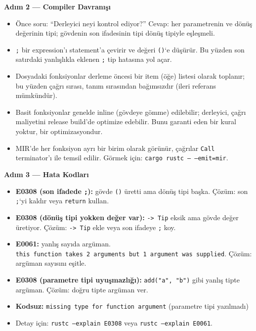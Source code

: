 \documentclass[12pt,a4paper]{article}
\begin{document}
\textbf{Adım 2 --- Compiler Davranışı}

\begin{itemize}
\tightlist
\item
  Önce soru: ``Derleyici neyi kontrol ediyor?'' Cevap: her parametrenin ve dönüş değerinin tipi; gövdenin son ifadesinin tipi dönüş tipiyle eşleşmeli.
\item
  \texttt{;} bir expression'ı statement'a çevirir ve değeri \texttt{()}`e düşürür. Bu yüzden son satırdaki yanlışlıkla eklenen \texttt{;} tip hatasına yol açar.
\item
  Dosyadaki fonksiyonlar derleme öncesi bir item (öğe) listesi olarak toplanır; bu yüzden çağrı sırası, tanım sırasından bağımsızdır (ileri referans mümkündür).
\item
  Basit fonksiyonlar genelde inline (gövdeye gömme) edilebilir; derleyici, çağrı maliyetini release build'de optimize edebilir. Bunu garanti eden bir kural yoktur, bir optimizasyondur.
\item
  MIR'de her fonksiyon ayrı bir birim olarak görünür, çağrılar \texttt{Call} terminator'ı ile temsil edilir. Görmek için: \texttt{cargo\ rustc\ --\ --emit=mir}.
\end{itemize}

\textbf{Adım 3 --- Hata Kodları}

\begin{itemize}
\tightlist
\item
  \textbf{E0308 (son ifadede \texttt{;}):} gövde \texttt{()} üretti ama dönüş tipi başka. Çözüm: son \texttt{;}`yi kaldır veya \texttt{return} kullan.
\item
  \textbf{E0308 (dönüş tipi yokken değer var):} \texttt{-\textgreater{}\ Tip} eksik ama gövde değer üretiyor. Çözüm: \texttt{-\textgreater{}\ Tip} ekle veya son ifadeye \texttt{;} koy.
\item
  \textbf{E0061:} yanlış sayıda argüman. \texttt{this\ function\ takes\ 2\ arguments\ but\ 1\ argument\ was\ supplied}. Çözüm: argüman sayısını eşitle.
\item
  \textbf{E0308 (parametre tipi uyuşmazlığı):} \texttt{add("a",\ "b")} gibi yanlış tipte argüman. Çözüm: doğru tipte argüman ver.
\item
  \textbf{Kodsuz:} \texttt{missing\ type\ for\ function\ argument} (parametre tipi yazılmadı)
\item
  Detay için: \texttt{rustc\ --explain\ E0308} veya \texttt{rustc\ --explain\ E0061}.
\end{itemize}
\end{document}
